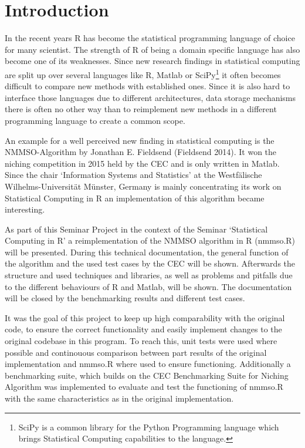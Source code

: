 \documentclass[12pt,a4paper]{article}
\begin{document}
\renewcommand\refname{References} %


\newpage
{} %
\tableofcontents
\newpage


\section{Introduction}\label{introduction}

In the recent years R has become the statistical programming language of
choice for many scientist. The strength of R of being a domain specific
language has also become one of its weaknesses. Since new research
findings in statistical computing are split up over several languages
like R, Matlab or SciPy\footnote{SciPy is a common library for the
  Python Programming language which brings Statistical Computing
  capabilities to the language. \newpage} it often becomes difficult to
compare new methods with established ones. Since it is also hard to
interface those languages due to different architectures, data storage
mechanisms there is often no other way than to reimplement new methods
in a different programming language to create a common scope.

An example for a well perceived new finding in statistical computing is
the NMMSO-Algorithm by Jonathan E. Fieldsend (Fieldsend 2014). It won
the niching competition in 2015 held by the CEC and is only written in
Matlab. Since the chair `Information Systems and Statistics' at the
Westfälische Wilhelms-Universität Münster, Germany is mainly
concentrating its work on Statistical Computing in R an implementation
of this algorithm became interesting.

As part of this Seminar Project in the context of the Seminar
`Statistical Computing in R' a reimplementation of the NMMSO algorithm
in R (nmmso.R) will be presented. During this technical documentation,
the general function of the algorithm and the used test cases by the CEC
will be shown. Afterwards the structure and used techniques and
libraries, as well as problems and pitfalls due to the different
behaviours of R and Matlab, will be shown. The documentation will be
closed by the benchmarking results and different test cases.

It was the goal of this project to keep up high comparability with the
original code, to ensure the correct functionality and easily implement
changes to the original codebase in this program. To reach this, unit
tests were used where possible and continouous comparison between part
results of the original implementation and nmmso.R where used to ensure
functioning. Additionally a benchmarking suite, which builds on the CEC
Benchmarking Suite for Niching Algorithm was implemented to evaluate and
test the functioning of nmmso.R with the same characteristics as in the
original implementation.
\end{document}
